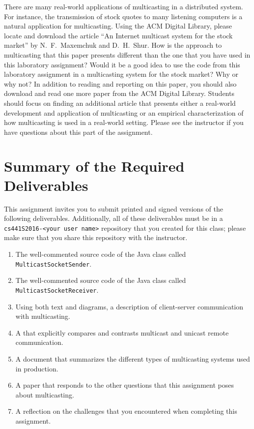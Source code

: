 There are many real-world applications of multicasting in a distributed system. For instance, the transmission of stock
quotes to many listening computers is a natural application for multicasting. Using the ACM Digital Library, please
locate and download the article ``An Internet multicast system for the stock market'' by N.\ F.\ Maxemchuk and D.\ H.\
Shur. How is the approach to multicasting that this paper presents different than the one that you have used in this
laboratory assignment? Would it be a good idea to use the code from this laboratory assignment in a multicasting system
for the stock market? Why or why not? In addition to reading and reporting on this paper, you should also download and
read one more paper from the ACM Digital Library. Students should focus on finding an additional article that presents
either a real-world development and application of multicasting or an empirical characterization of how multicasting is
used in a real-world setting. Please see the instructor if you have questions about this part of the assignment.

\section*{Summary of the Required Deliverables}

This assignment invites you to submit printed and signed versions of the following deliverables. Additionally,
all of these deliverables must be in a {\tt cs441S2016-<your user name>} repository that you created for this class;
please make sure that you share this repository with the instructor.

\vspace*{-.1in}

\begin{enumerate}
  \itemsep 0em

  \item The well-commented source code of the Java class called {\tt MulticastSocketSender}.

  \item The well-commented source code of the Java class called {\tt MulticastSocketReceiver}.

  \item Using both text and diagrams, a description of client-server communication with multicasting.

  \item A that explicitly compares and contrasts multicast and unicast remote communication.

  \item A document that summarizes the different types of multicasting systems used in production.

  \item A paper that responds to the other questions that this assignment poses about multicasting.

  \item A reflection on the challenges that you encountered when completing this assignment.

\end{enumerate}


